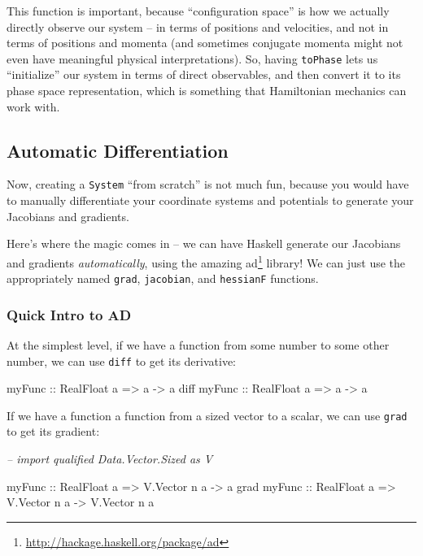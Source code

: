 \documentclass[]{article}
\newenvironment{Shaded}{}{}
\newcommand{\CommentTok}[1]{\textcolor[rgb]{0.38,0.63,0.69}{\textit{#1}}}
\newcommand{\DataTypeTok}[1]{\textcolor[rgb]{0.56,0.13,0.00}{#1}}
\newcommand{\NormalTok}[1]{#1}
\newcommand{\OtherTok}[1]{\textcolor[rgb]{0.00,0.44,0.13}{#1}}
\renewcommand{\href}[2]{#2\footnote{\url{#1}}}
\begin{document}
This function is important, because ``configuration space'' is how we actually
directly observe our system -- in terms of positions and velocities, and not in
terms of positions and momenta (and sometimes conjugate momenta might not even
have meaningful physical interpretations). So, having \texttt{toPhase} lets us
``initialize'' our system in terms of direct observables, and then convert it to
its phase space representation, which is something that Hamiltonian mechanics
can work with.

\hypertarget{automatic-differentiation}{%
\subsection{Automatic Differentiation}\label{automatic-differentiation}}

Now, creating a \texttt{System} ``from scratch'' is not much fun, because you
would have to manually differentiate your coordinate systems and potentials to
generate your Jacobians and gradients.

Here's where the magic comes in -- we can have Haskell generate our Jacobians
and gradients \emph{automatically}, using the amazing
\href{http://hackage.haskell.org/package/ad}{ad} library! We can just use the
appropriately named \texttt{grad}, \texttt{jacobian}, and \texttt{hessianF}
functions.

\hypertarget{quick-intro-to-ad}{%
\subsubsection{Quick Intro to AD}\label{quick-intro-to-ad}}

At the simplest level, if we have a function from some number to some other
number, we can use \texttt{diff} to get its derivative:

\begin{Shaded}
\begin{Highlighting}[]
\OtherTok{myFunc      ::} \DataTypeTok{RealFloat}\NormalTok{ a }\OtherTok{=>}\NormalTok{ a }\OtherTok{->}\NormalTok{ a}
\NormalTok{diff}\OtherTok{ myFunc ::} \DataTypeTok{RealFloat}\NormalTok{ a }\OtherTok{=>}\NormalTok{ a }\OtherTok{->}\NormalTok{ a}
\end{Highlighting}
\end{Shaded}

If we have a function a function from a sized vector to a scalar, we can use
\texttt{grad} to get its gradient:

\begin{Shaded}
\begin{Highlighting}[]
\CommentTok{-- import qualified Data.Vector.Sized as V}

\OtherTok{myFunc      ::} \DataTypeTok{RealFloat}\NormalTok{ a }\OtherTok{=>} \DataTypeTok{V.Vector}\NormalTok{ n a }\OtherTok{->}\NormalTok{ a}
\NormalTok{grad}\OtherTok{ myFunc ::} \DataTypeTok{RealFloat}\NormalTok{ a }\OtherTok{=>} \DataTypeTok{V.Vector}\NormalTok{ n a }\OtherTok{->} \DataTypeTok{V.Vector}\NormalTok{ n a}
\end{Highlighting}
\end{Shaded}
\end{document}
